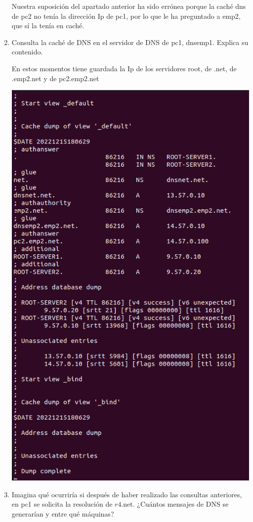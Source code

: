 \documentclass[12pt, a4paper]{report}
\begin{document}
\begin{enumerate}
  Nuestra suposición del apartado anterior ha sido errónea porque la caché dns de pc2 no tenía la dirección Ip de pc1, por lo que le ha preguntado a emp2, que sí la tenía en caché.

  \item Consulta la caché de DNS en el servidor de DNS de pc1, dnsemp1. Explica su contenido.

  En estos momentos tiene guardada la Ip de los servidores root, de .net, de .emp2.net y de pc2.emp2.net

	\includegraphics*[width=128mm, scale=0.5, center]{ejercicio4}

  \item Imagina qué ocurriría si después de haber realizado las consultas anteriores, en pc1 se solicita la resolución de $r 4$.net. ¿Cuántos mensajes de DNS se generarían y entre qué máquinas?
  

\end{enumerate}
\end{document}
